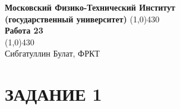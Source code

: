 \documentclass[a4paper, 12pt]{article}%
\begin{document}
\begin{titlepage}

\begin{center}
\large\textbf{Московский Физико-Технический Институт}\\
\large\textbf{(государственный университет)}
\vfill
\line(1,0){430}\\[1mm]
\huge\textbf{Работа 23}\\
\line(1,0){430}\\[1mm]
\vfill
\large Сибгатуллин Булат, ФРКТ\\
\end{center}

\end{titlepage}

\section*{ЗАДАНИЕ 1}
\end{document}
